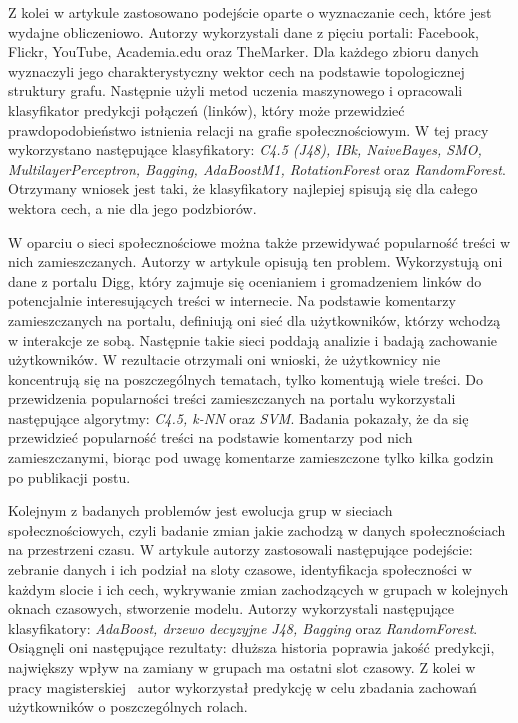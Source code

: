 \documentclass[polish,12pt]{aghthesis}
\begin{document}
Z kolei w artykule\cite{link2} zastosowano podejście oparte o wyznaczanie cech, które jest wydajne obliczeniowo. Autorzy wykorzystali dane z pięciu portali: Facebook, Flickr, YouTube, Academia.edu oraz TheMarker. Dla każdego zbioru danych wyznaczyli jego charakterystyczny wektor cech na podstawie topologicznej struktury grafu. Następnie użyli metod uczenia maszynowego i opracowali klasyfikator predykcji połączeń (linków), który może przewidzieć prawdopodobieństwo istnienia relacji na grafie społecznościowym. W tej pracy wykorzystano następujące klasyfikatory: \textit{C4.5 (J48), IBk, NaiveBayes, SMO, MultilayerPerceptron, Bagging, AdaBoostM1, RotationForest} oraz \textit{RandomForest}. Otrzymany wniosek jest taki, że klasyfikatory najlepiej spisują się dla całego wektora cech, a nie dla jego podzbiorów.

\vspace{5mm}
W oparciu o sieci społecznościowe można także przewidywać popularność treści w nich zamieszczanych. Autorzy w artykule\cite{digg} opisują ten problem. Wykorzystują oni dane z portalu Digg, który zajmuje się ocenianiem i gromadzeniem linków do potencjalnie interesujących treści w internecie. Na podstawie komentarzy zamieszczanych na portalu, definiują oni sieć dla użytkowników, którzy wchodzą w interakcje ze sobą. Następnie takie sieci poddają analizie i badają zachowanie użytkowników. W rezultacie otrzymali oni wnioski, że użytkownicy nie koncentrują się na poszczególnych tematach, tylko komentują wiele treści. Do przewidzenia popularności treści zamieszczanych na portalu wykorzystali następujące algorytmy: \textit{C4.5, k-NN} oraz \textit{SVM}. Badania pokazały, że da się przewidzieć popularność treści na podstawie komentarzy pod nich zamieszczanymi, biorąc pod uwagę komentarze zamieszczone tylko kilka godzin po publikacji postu.


\vspace{5mm}
Kolejnym z badanych problemów jest ewolucja grup w sieciach społecznościowych, czyli badanie zmian jakie zachodzą w danych społecznościach na przestrzeni czasu. W artykule\cite{group_evol} autorzy zastosowali następujące podejście: zebranie danych i ich podział na sloty czasowe, identyfikacja społeczności w każdym slocie i ich cech, wykrywanie zmian zachodzących w grupach w kolejnych oknach czasowych, stworzenie modelu. Autorzy wykorzystali następujące klasyfikatory: \textit{AdaBoost, drzewo decyzyjne J48, Bagging} oraz \textit{RandomForest}. Osiągnęli oni następujące rezultaty: dłuższa historia poprawia jakość predykcji, największy wpływ na zamiany w grupach ma ostatni slot czasowy. Z kolei w pracy magisterskiej~\cite{mgr} autor wykorzystał predykcję w celu zbadania zachowań użytkowników o poszczególnych rolach. 
\end{document}
